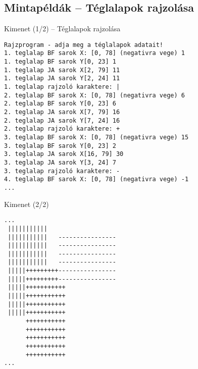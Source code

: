 \documentclass[usenames,dvipsnames,aspectratio=169]{beamer}
\begin{document}
\subsection{Mintapéldák -- Téglalapok rajzolása}
\begin{frame}[fragile]
  \scriptsize
  \begin{block}{Kimenet (1/2) -- Téglalapok rajzolása}
    \vspace{-.3cm}
    \begin{verbatim}
Rajzprogram - adja meg a téglalapok adatait!
1. teglalap BF sarok X: [0, 78] (negativra vege) 1
1. teglalap BF sarok Y[0, 23] 1
1. teglalap JA sarok X[2, 79] 11
1. teglalap JA sarok Y[2, 24] 11
1. teglalap rajzoló karaktere: |
2. teglalap BF sarok X: [0, 78] (negativra vege) 6
2. teglalap BF sarok Y[0, 23] 6
2. teglalap JA sarok X[7, 79] 16
2. teglalap JA sarok Y[7, 24] 16
2. teglalap rajzoló karaktere: +
3. teglalap BF sarok X: [0, 78] (negativra vege) 15
3. teglalap BF sarok Y[0, 23] 2
3. teglalap JA sarok X[16, 79] 30
3. teglalap JA sarok Y[3, 24] 7
3. teglalap rajzoló karaktere: -
4. teglalap BF sarok X: [0, 78] (negativra vege) -1
...
\end{verbatim}
    \vspace{-.3cm}
  \end{block}
\end{frame}

\begin{frame}[fragile]
  \scriptsize
  \begin{block}{Kimenet (2/2)}
    \vspace{-.3cm}
    \begin{verbatim}
...
 |||||||||||                                                                   
 |||||||||||   ----------------                                                
 |||||||||||   ----------------                                                
 |||||||||||   ----------------                                                
 |||||||||||   ----------------                                                
 |||||+++++++++----------------                                                
 |||||+++++++++----------------                                                
 |||||+++++++++++                                                              
 |||||+++++++++++                                                              
 |||||+++++++++++                                                              
 |||||+++++++++++                                                              
      +++++++++++                                                              
      +++++++++++                                                              
      +++++++++++                                                              
      +++++++++++                                                              
      +++++++++++
...
\end{verbatim}
    \vspace{-.3cm}
  \end{block}
\end{frame}
\end{document}
